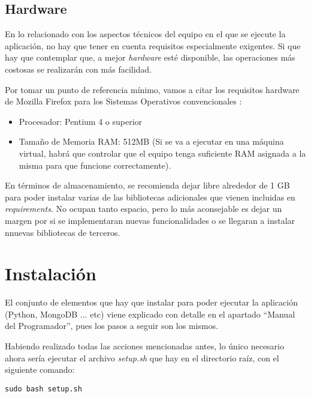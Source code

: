 \subsection{Hardware}

En lo relacionado con los aspectos técnicos del equipo en el que se ejecute la aplicación, no hay que tener en cuenta requisitos especialmente exigentes. Si que hay que contemplar que, a mejor \emph{hardware} esté disponible, las operaciones más costosas se realizarán con más facilidad.

Por tomar un punto de referencia mínimo, vamos a citar los requisitos hardware de Mozilla Firefox para los Sistemas Operativos convencionales \cite{mozillarequirements}:

\begin{itemize}

\item Procesador: Pentium 4 o superior

\item Tamaño de Memoria RAM: 512MB (Si se va a ejecutar en una máquina virtual, habrá que controlar que el equipo tenga suficiente RAM asignada a la misma para que funcione correctamente).

\end{itemize}

En términos de almacenamiento, se recomienda dejar libre alrededor de 1 GB para poder instalar varias de las bibliotecas adicionales que vienen incluidas en \emph{requirements}. No ocupan tanto espacio, pero lo más aconsejable es dejar un margen por si se implementaran nuevas funcionalidades o se llegaran a instalar nnuevas bibliotecas de terceros.

\section{Instalación}

El conjunto de elementos que hay que instalar para poder ejecutar la aplicación (Python, MongoDB ... etc) viene explicado con detalle en el apartado ``Manual del Programador'', pues los pasos a seguir son los mismos.

Habiendo realizado todas las acciones mencionadas antes, lo único necesario ahora sería ejecutar el archivo \emph{setup.sh} que hay en el directorio raíz, con el siguiente comando:

\begin{verbatim}
sudo bash setup.sh
\end{verbatim}

